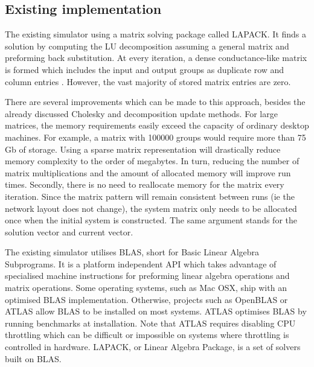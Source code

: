 \documentclass[11pt]{article}
\begin{document}
\subsection{Existing implementation}
The existing simulator using a matrix solving package called LAPACK. It finds a solution by computing the LU decomposition assuming a general matrix and preforming back substitution. At every iteration, a dense conductance-like matrix is formed which includes the input and output groups as duplicate row and column entries \cite{alex}. However, the vast majority of stored matrix entries are zero.

There are several improvements which can be made to this approach, besides the already discussed Cholesky and decomposition update methods. For large matrices, the memory requirements easily exceed the capacity of ordinary desktop machines. For example, a matrix with \num{100000} groups would require more than 75 Gb of storage. Using a sparse matrix representation will drastically reduce memory complexity to the order of megabytes. In turn, reducing the number of matrix multiplications and the amount of allocated memory will improve run times. Secondly, there is no need to reallocate memory for the matrix every iteration. Since the matrix pattern will remain consistent between runs (ie the network layout does not change), the system matrix only needs to be allocated once when the initial system is constructed. The same argument stands for the solution vector and current vector.

The existing simulator utilises BLAS, short for Basic Linear Algebra Subprograms. It is a platform independent API which takes advantage of specialised machine instructions for preforming linear algebra operations and matrix operations. Some operating systems, such as Mac OSX, ship with an optimised BLAS implementation\cite{apple}. Otherwise, projects such as OpenBLAS\cite{blas} or ATLAS\cite{atlas} allow BLAS to be installed on most systems. ATLAS optimises BLAS by running benchmarks at installation. Note that ATLAS requires disabling CPU throttling which can be difficult or impossible on systems where throttling is controlled in hardware. LAPACK, or Linear Algebra Package, is a set of solvers built on BLAS.
\end{document}
